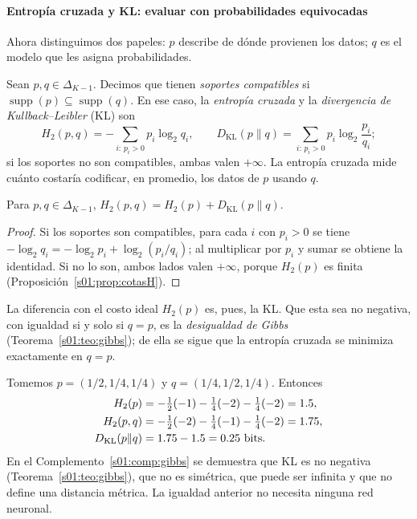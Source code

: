 \paragraph{Entropía cruzada y KL: evaluar con probabilidades equivocadas}
Ahora distinguimos dos papeles: $p$ describe de dónde provienen los datos; $q$ es
el modelo que les asigna probabilidades.
\begin{definicion}\label{s01:def:kl}
Sean $p,q\in\Delta_{K-1}$. Decimos que tienen \emph{soportes compatibles} si
$\operatorname{supp}(p)\subseteq\operatorname{supp}(q)$. En ese caso, la
\emph{entropía cruzada} y la \emph{divergencia de Kullback--Leibler} (KL) son
\[
H_2(p,q)=-\sum_{i:\,p_i>0}p_i\log_2q_i,\qquad
D_{\mathrm{KL}}(p\|q)=\sum_{i:\,p_i>0}p_i\log_2\frac{p_i}{q_i};
\]
si los soportes no son compatibles, ambas valen $+\infty$. La entropía cruzada
mide cuánto costaría codificar, en promedio, los datos de $p$ usando $q$.
\end{definicion}
\begin{proposicion}[Entropía cruzada = entropía + KL]\label{s01:prop:cruzada}
Para $p,q\in\Delta_{K-1}$, $H_2(p,q)=H_2(p)+D_{\mathrm{KL}}(p\|q)$.
\end{proposicion}
\begin{proof}
Si los soportes son compatibles, para cada $i$ con $p_i>0$ se tiene
$-\log_2q_i=-\log_2p_i+\log_2(p_i/q_i)$; al multiplicar por $p_i$ y sumar se
obtiene la identidad. Si no lo son, ambos lados valen $+\infty$, porque $H_2(p)$
es finita (Proposición~\ref{s01:prop:cotasH}).
\end{proof}
\noindent La diferencia con el costo ideal $H_2(p)$ es, pues, la KL. Que esta sea
no negativa, con igualdad si y solo si $q=p$, es la \emph{desigualdad de Gibbs}
(Teorema~\ref{s01:teo:gibbs}); de ella se sigue que la entropía cruzada se minimiza
exactamente en $q=p$.
\begin{ejemplo}
Tomemos $p=(1/2,1/4,1/4)$ y $q=(1/4,1/2,1/4)$. Entonces
\begin{align*}
H_2(p)&=-\tfrac12(-1)-\tfrac14(-2)-\tfrac14(-2)=1.5,\\
H_2(p,q)&=-\tfrac12(-2)-\tfrac14(-1)-\tfrac14(-2)=1.75,\\
D_{\rm KL}(p\|q)&=1.75-1.5=0.25\ \text{bits}.
\end{align*}
En el Complemento~\ref{s01:comp:gibbs} se demuestra que KL es no negativa (Teorema~\ref{s01:teo:gibbs}), que no es simétrica, que puede ser infinita y que no define una distancia métrica. La igualdad anterior no necesita ninguna red neuronal.
\end{ejemplo}
